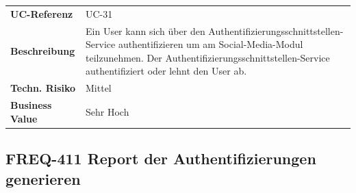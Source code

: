 \begin{longtable}[c]{@{}ll@{}}
\toprule
\begin{minipage}[t]{0.20\columnwidth}\raggedright\strut
\textbf{UC-Referenz}
\strut\end{minipage} &
\begin{minipage}[t]{0.74\columnwidth}\raggedright\strut
UC-31
\strut\end{minipage}\tabularnewline
\begin{minipage}[t]{0.20\columnwidth}\raggedright\strut
\textbf{Beschreibung}
\strut\end{minipage} &
\begin{minipage}[t]{0.74\columnwidth}\raggedright\strut
Ein User kann sich über den Authentifizierungsschnittstellen-Service
authentifizieren um am Social-Media-Modul teilzunehmen. Der
Authentifizierungsschnittstellen-Service authentifiziert oder lehnt den
User ab.
\strut\end{minipage}\tabularnewline
\begin{minipage}[t]{0.20\columnwidth}\raggedright\strut
\textbf{Techn. Risiko}
\strut\end{minipage} &
\begin{minipage}[t]{0.74\columnwidth}\raggedright\strut
Mittel
\strut\end{minipage}\tabularnewline
\begin{minipage}[t]{0.20\columnwidth}\raggedright\strut
\textbf{Business Value}
\strut\end{minipage} &
\begin{minipage}[t]{0.74\columnwidth}\raggedright\strut
Sehr Hoch
\strut\end{minipage}\tabularnewline
\bottomrule
\end{longtable}

\subsection{FREQ-411 Report der Authentifizierungen
generieren}\label{freq-411-report-der-authentifizierungen-generieren}

